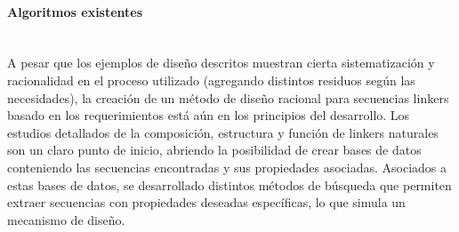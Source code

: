







\paragraph{Algoritmos existentes} \hspace{0pt} \\ \indent 
% 
% 
A pesar que los ejemplos de diseño descritos muestran cierta sistematización y racionalidad en el proceso utilizado (agregando distintos residuos según las necesidades), 
la creación de un método de diseño racional para secuencias linkers basado en los requerimientos está aún en los principios del desarrollo. 
Los estudios detallados de la composición, estructura y función de linkers naturales son un claro punto de inicio, 
abriendo la posibilidad de crear bases de datos conteniendo las secuencias encontradas y sus propiedades asociadas.
Asociados a estas bases de datos, se desarrollado distintos métodos de búsqueda que permiten extraer secuencias con propiedades deseadas específicas, lo que simula un mecanismo de diseño.


